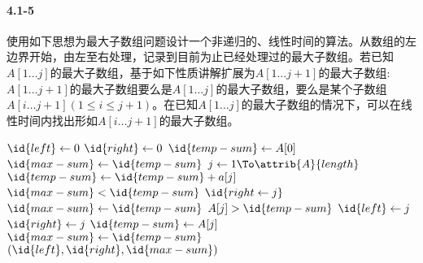 \documentclass[a4paper,11pt]{article}
\begin{document}
\paragraph*{4.1-5}
使用如下思想为最大子数组问题设计一个非递归的、线性时间的算法。从数组的左边界开始，由左至右处理，记录到目前为止已经处理过的最大子数组。若已知$A[1 \dots j]$的最大子数组，基于如下性质讲解扩展为$A[1 \dots j+1]$的最大子数组:$A[1 \dots j+1]$的最大子数组要么是$A[1 \dots j]$的最大子数组，要么是某个子数组$A[i \dots j+1](1 \leq i \leq j+1)$。在已知$A[1 \dots j]$的最大子数组的情况下，可以在线性时间内找出形如$A[i \dots j+1]$的最大子数组。
\begin{codebox}
	\li	$\id{left} \gets 0$
	\li $\id{right} \gets 0$
	\li $\id{temp-sum} \gets A[0]$
	\li $\id{max-sum} \gets \id{temp-sum}$
	\li \For $j \gets 1 \To \attrib{A}{length}$
	\li		\Do $\id{temp-sum} \gets \id{temp-sum} + a[j]$
	\li		\If $\id{max-sum} < \id{temp-sum}$
	\li			\Then $\id{right \gets j}$
	\li			$\id{max-sum} \gets \id{temp-sum}$
	\li			\Else
	\li				\If $A[j] > \id{temp-sum}$
	\li					\Then $\id{left} \gets j$
	\li					$\id{right} \gets j$
	\li					$\id{temp-sum} \gets A[j]$
	\li					$\id{max-sum} \gets \id{temp-sum}$
							\End
					\End
				\End
	\li \Return $(\id{left},\id{right},\id{max-sum})$
\end{codebox}
\end{document}
